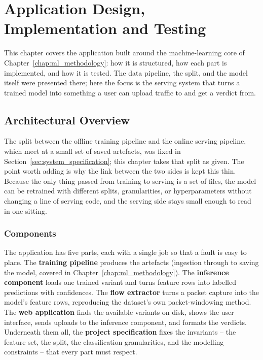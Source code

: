\chapter{Application Design, Implementation and Testing}
\label{chap:design_implementation}

\par This chapter covers the application built around the machine-learning core of Chapter~\ref{chap:ml_methodology}: how it is structured, how each part is implemented, and how it is tested. The data pipeline, the split, and the model itself were presented there; here the focus is the serving system that turns a trained model into something a user can upload traffic to and get a verdict from.

\section{Architectural Overview}
\label{sec:architecture_overview}

\par The split between the offline training pipeline and the online serving pipeline, which meet at a small set of saved artefacts, was fixed in Section~\ref{sec:system_specification}; this chapter takes that split as given. The point worth adding is why the link between the two sides is kept this thin. Because the only thing passed from training to serving is a set of files, the model can be retrained with different splits, granularities, or hyperparameters without changing a line of serving code, and the serving side stays small enough to read in one sitting.

\subsection{Components}
\label{subsec:module_decomposition}

\par The application has five parts, each with a single job so that a fault is easy to place. The \textbf{training pipeline} produces the artefacts (ingestion through to saving the model, covered in Chapter~\ref{chap:ml_methodology}). The \textbf{inference component} loads one trained variant and turns feature rows into labelled predictions with confidences. The \textbf{flow extractor} turns a packet capture into the model's feature rows, reproducing the dataset's own packet-windowing method. The \textbf{web application} finds the available variants on disk, shows the user interface, sends uploads to the inference component, and formats the verdicts. Underneath them all, the \textbf{project specification} fixes the invariants -- the feature set, the split, the classification granularities, and the modelling constraints -- that every part must respect.

